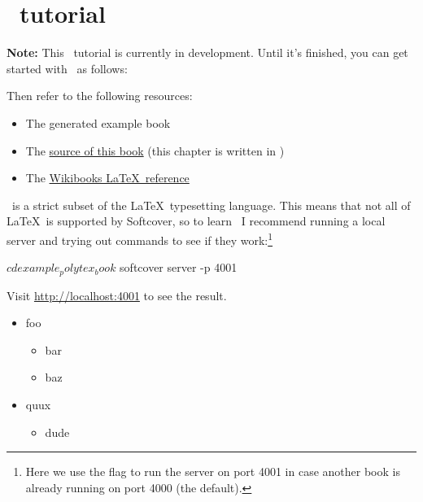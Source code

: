 \chapter{\PolyTeX\ tutorial} %
\label{cha:polytex_tutorial}

\textbf{Note:} This \PolyTeX\ tutorial is currently in development. Until it's finished, you can get started with \PolyTeX\ as follows:


\noindent Then refer to the following resources:

\begin{itemize}
\item The generated example book
\item The \href{https://github.com/softcover/softcover_book}{source of this book} (this chapter is written in \PolyTeX)
\item The \href{http://en.wikibooks.org/wiki/LaTeX}{Wikibooks \LaTeX\ reference}
\end{itemize}

\PolyTeX\ is a strict subset of the \LaTeX\ typesetting language. This means that not all of \LaTeX\ is supported by Softcover, so to learn \PolyTeX\ I recommend running a local server and trying out commands to see if they work:\footnote{Here we use the  flag to run the server on port 4001 in case another book is already running on port 4000 (the default).}

\begin{code}
$ cd example_polytex_book
$ softcover server -p 4001
\end{code}

\noindent Visit \href{http://localhost:4001}{http://localhost:4001} to see the result.

\begin{itemize}
\item foo


\begin{itemize}
\item bar
\item baz
\end{itemize}
\item quux


\begin{itemize}
\item dude
\end{itemize}
\end{itemize}

